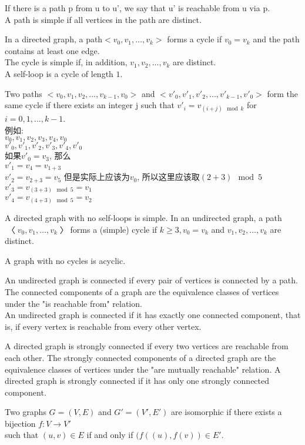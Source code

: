 \documentclass{article}
\begin{document}
If there is a path p from u to u', we say that u' is reachable from u via p.\\
A path is simple if all vertices in the path are distinct.

\bigskip
In a directed graph, a path$<v_0, v_1, \ldots, v_k>$ forms a cycle if $v_0=v_k$  and the path contains at least one edge. \\
The cycle is simple if, in addition, $v_1, v_2,..., v_k$ are distinct. \\
A self-loop is a cycle of length $1$.

Two paths $<v_0, v_1, v_2, \ldots,v_{k-1}, v_0>$  and $<v'_0, v'_1, v'_2, \ldots,v'_{k-1}, v'_0>$ form the same cycle if there exists an integer j such that $v'_i=v_{(i+j) \mod k}$ for $i = 0, 1,..., k - 1$.\\
例如:\\
$v_0, v_1, v_2, v_3, v_4, v_0$\\
$v'_0, v'_1, v'_2, v'_3, v'_4, v'_0$\\
如果$v'_0 = v_3$, 那么\\
$v'_1=v_4=v_{1+3}$\\
$v'_2=v_{2+3}=v_5$ 但是实际上应该为$v_0$, 所以这里应该取{$(2+3) \mod5$}\\
$v'_3=v_{(3+3)\mod 5}=v_1$\\
$v'_4=v_{(4+3) \mod 5}=v_2$

A directed graph with no self-loops is simple. In an undirected graph, a path$〈v_0, v_1, \ldots, v_k〉$forms a (simple) cycle if $k \geq 3,v_0 = v_k$ and $v_1, v_2, \ldots, v_k$ are distinct.

A graph with no cycles is acyclic.

\bigskip
An undirected graph is connected if every pair of vertices is connected by a path. \\
The connected components of a graph are the equivalence classes of vertices under the "is reachable from" relation.\\
An undirected graph is connected if it has exactly one connected component, that is, if every vertex is reachable from every other vertex.

A directed graph is strongly connected if every two vertices are reachable from each other. The strongly connected components of a directed graph are the equivalence classes of vertices under the "are mutually reachable" relation. A directed graph is strongly connected if it has only one strongly connected component.

Two graphs $G = (V, E)$ and $G' = (V', E')$ are isomorphic if there exists a bijection $f : V \rightarrow V'$ \\
such that $(u, v) \in E$ if and only if $(f((u), f(v)) \in E'$.
\end{document}
